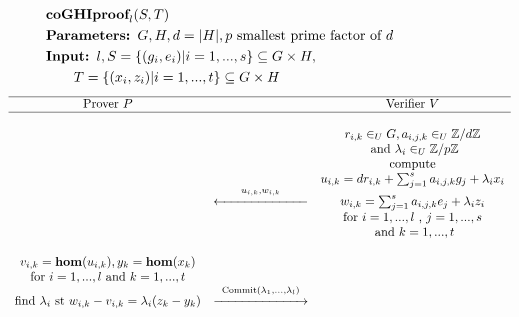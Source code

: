 \begin{figure}[!h]
    \hskip -25pt
    \[
        \begin{split}
        &\mbox{\bf coGHIproof}_l(S,T)\\
        &\mbox{\bf Parameters: } G,H,d=|H|,p \mbox{ smallest prime factor of } d\\
        &\mbox{\bf Input: } l,S = \{(g_i,e_i)|i=1,...,s\} \subseteq G\times H,\\
        & \quad\quad T = \{(x_i,z_i)|i=1,...,t\} \subseteq G \times H\\  
        \end{split}
    \]
    \[
        \begin{array}{ccc}
        \hline
            \mbox{Prover } P                      &                  & \mbox{Verifier } V                                  \\
        \hline
                                                  &                  &                                                     \\
                                                  &                  & r_{i,k} \in_U G, a_{i,j,k} \in_U \mathbb{Z}/d\mathbb{Z}  \\ 
                                                  && \mbox{ and } \lambda_i \in_U \mathbb{Z}/p\mathbb{Z} \\
                                                  &                  & \mbox{compute}                                      \\
                                                  &                  & u_{i,k} = dr_{i,k} + \sum_{j=1}^{s}{a_{i,j,k}g_{j}} + \lambda_i x_i           \\
                                                  & \overset{u_{i,k},w_{i,k}}{\xleftarrow{\hspace*{70pt}}} & w_{i,k} = \sum_{j=1}^{s}{a_{i,j,k}e_{j}} + \lambda_i z_i           \\
                                                  &                  & \mbox{for } i = 1,...,l \mbox{ , } j=1,...,s       \\
                                                  & & \mbox{ and } k=1,...,t\\
                                                  &&\\
        v_{i,k} = \mathbf{hom}(u_{i,k}),  y_k = \mathbf{hom}(x_k) &&\\
     \mbox{for } i=1,...,l \mbox{ and } k=1,...,t &&\\
     \mbox{find } \lambda_i \mbox{ st } w_{i,k} -v_{i,k} = \lambda_i(z_k-y_k) & \overset{\mathrm{Commit}(\lambda_1,...,\lambda_l)}{\xrightarrow{\hspace*{70pt}}} &                                   \\

\end{array}\]
\end{figure}
